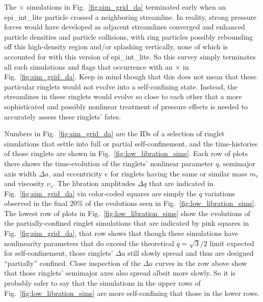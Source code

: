 \documentclass[preprint]{aastex62}
\begin{document}
The $\times$ simulations in Fig.\ \ref{fig:sim_grid_da}
terminated early when an epi\_int\_lite particle crossed a 
neighboring streamline. In reality, strong 
pressure forces would have developed as adjacent streamlines converged
and enhanced particle densities and particle collisions, with ring particles
possibly rebounding off this high-density region and/or splashing vertically,
none of which is accounted for with this version of epi\_int\_lite. 
So this survey simply terminates all such simulations and flags that occurrence with an 
$\times$ in Fig.\ \ref{fig:sim_grid_da}. Keep in mind though that this does not mean
that these particular ringlets would not evolve into a self-confining state. Instead,
the streamlines in these ringlets would evolve so close to each other that a more sophisticated
and possibly nonlinear treatment of pressure effects is needed 
to accurately assess these ringlets' fates.

Numbers in Fig.\ \ref{fig:sim_grid_da} are the IDs of a selection of 
ringlet simulations that settle into full or partial self-confinement, 
and the time-histories of those ringlets are
shown in Fig.\ \ref{fig:low_libration_sims}. Each row of plots there shows
the time-evolution of the ringlets' nonlinear parameter $q$, semimajor axis width
$\Delta a$, and eccentricity $e$ for ringlets having the same or similar
mass $m_r$ and viscosity $\nu_s$. The libration amplitudes $\Delta q$
that are indicated in Fig.\ \ref{fig:sim_grid_da} via color-coded squares are simply
the $q$ variations observed in the final $20\%$ of the evolutions
seen in Fig.\ \ref{fig:low_libration_sims}.
The lowest row of plots in Fig.\ \ref{fig:low_libration_sims}
show the evolutions of the partially-confined ringlet simulations that are
indicated  by pink squares in Fig.\ \ref{fig:sim_grid_da}, that row
shows that though these simulations have nonlinearity parameters
that do exceed the theoretical $q=\sqrt{3}/2$ limit expected for self-confinement,
those ringlets' $\Delta a$ still slowly spread and thus are designed 
``partially'' confined.  Close inspection
of the $\Delta a$ curves in the row above show that those ringlets' semimajor axes
also spread albeit more slowly. So it is probably safer to say that the
simulations in the upper rows of Fig.\ \ref{fig:low_libration_sims}
are more self-confining that those in the lower rows.
\end{document}
